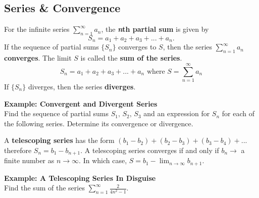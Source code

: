 \subsection*{Series \& Convergence}


\begin{tcolorbox}[title= DEFINITION OF CONVERGENT AND DIVERGENT SERIES,colframe=black,sharp corners,colback=white,colbacktitle=white,coltitle=black]

    For the infinite series $\displaystyle\sum_{n=1}^{\infty}a_n$, the \textbf{\textit{n}th partial sum} is given by
    \[S_n=a_1+a_2+a_3+...+a_n.\]
    If the sequence of partial sums $\{S_n\}$ converges to $S$, then the series $\displaystyle\sum_{n=1}^{\infty}a_n$ \textbf{converges}. The limit $S$ is called the \textbf{sum of the series}. 
    \[S_n=a_1+a_2+a_3+...+a_n \text{   where   }S=\sum_{n=1}^{\infty}a_n\]
    If $\{S_n\}$ diverges, then the series \textbf{diverges}.

\end{tcolorbox}
\vspace{.1in}

\noindent\textbf{Example: Convergent and Divergent Series}\\
Find the sequence of partial sums $S_1,\, S_2,\, S_3$ and an expression for $S_n$ for each of the following series. Determine its convergence or divergence.


\noindent A \textbf{telescoping series} has the form $(b_1-b_2)+(b_2-b_3)+(b_3-b_4)+...$ therefore $S_n=b_1-b_{n+1}$. A telescoping series converges if and only if $b_n\rightarrow$ a finite number as $n\rightarrow\infty$. In which case, $\displaystyle S=b_1-\lim_{n\to\infty}b_{n+1}$.

\newpage


\noindent\textbf{Example: A Telescoping Series In Disguise}\\
Find the sum of the series $\displaystyle\sum_{n=1}^{\infty}\frac{2}{4n^2-1}$.


